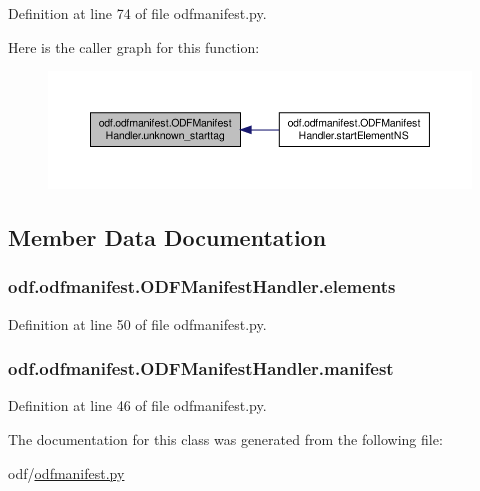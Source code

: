 Definition at line 74 of file odfmanifest.\+py.



Here is the caller graph for this function\+:
\nopagebreak
\begin{figure}[H]
\begin{center}
\leavevmode
\includegraphics[width=350pt]{classodf_1_1odfmanifest_1_1ODFManifestHandler_a1a13ef4fd1ec9ac8512a12af644cf7e3_icgraph}
\end{center}
\end{figure}




\subsection{Member Data Documentation}
\hypertarget{classodf_1_1odfmanifest_1_1ODFManifestHandler_aaff81d529c30f7486c8eac6cdc616ca7}{
\subsubsection[{elements}]{\setlength{\rightskip}{0pt plus 5cm}odf.\+odfmanifest.\+O\+D\+F\+Manifest\+Handler.\+elements}}\label{classodf_1_1odfmanifest_1_1ODFManifestHandler_aaff81d529c30f7486c8eac6cdc616ca7}


Definition at line 50 of file odfmanifest.\+py.

\hypertarget{classodf_1_1odfmanifest_1_1ODFManifestHandler_a6c4e396649fdb2ed1af0b332977efa58}{
\subsubsection[{manifest}]{\setlength{\rightskip}{0pt plus 5cm}odf.\+odfmanifest.\+O\+D\+F\+Manifest\+Handler.\+manifest}}\label{classodf_1_1odfmanifest_1_1ODFManifestHandler_a6c4e396649fdb2ed1af0b332977efa58}


Definition at line 46 of file odfmanifest.\+py.



The documentation for this class was generated from the following file\+:\begin{DoxyCompactItemize}
\item 
odf/\hyperlink{odfmanifest_8py}{odfmanifest.\+py}\end{DoxyCompactItemize}
